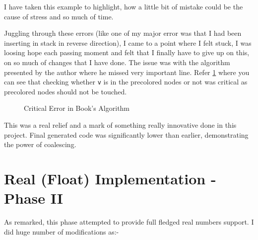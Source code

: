 I have taken this example to highlight, how a little bit of mistake could be the cause of stress and so much of time.

Juggling through these errors (like one of my major error was that I had been inserting in stack in reverse direction), I came to a point where I felt stuck, I was loosing hope each passing moment and felt that I finally have to give up on this, on so much of changes that I have done. The issue was with the algorithm presented by the author where he missed very important line. Refer \ref{fig:culprit} where you can see that checking whether \texttt{v} is in the precolored nodes or not was critical as precolored nodes should not be touched. 

\begin{figure}
\centering
{}
\caption{Critical Error in Book's Algorithm}
\label{fig:culprit}
\end{figure}

This was a real relief and a mark of something really innovative done in this project. Final generated code was significantly lower than earlier, demonstrating the power of coalescing. 

\section{Real (Float) Implementation - Phase II}

As remarked, this phase attempted to provide full fledged real numbers support. I did huge number of modifications as:- 


